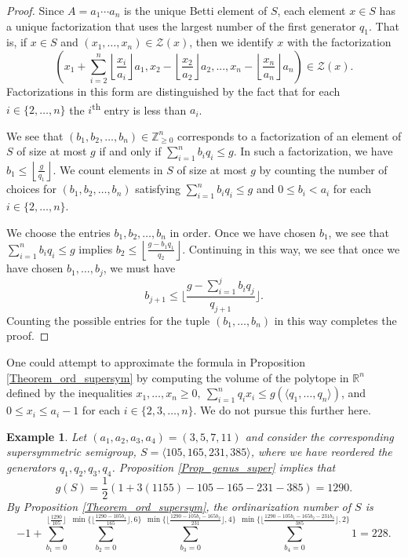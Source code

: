 \documentclass[12pt]{amsart}
\newcommand{\Z}{{\mathbb Z}}
\newcommand{\R}{{\mathbb R}}
\theoremstyle{plain}\newtheorem{proposition}{Proposition}[section]
\newtheorem{example}[proposition]{Example}
\begin{document}
\begin{proof}
Since $A = a_1 \cdots a_n$ is the unique Betti element of $S$, each element $x\in S$ has a unique factorization that uses the largest number of the first generator $q_1$.  That is, if $x \in S$ and $(x_1,\ldots, x_n) \in \mathcal{Z}(x)$, then we identify $x$ with the factorization 
\[
\left(x_1+\sum\limits_{i=2}^n \left\lfloor\frac{x_i}{a_i}\right\rfloor a_1,x_2-\left\lfloor\frac{x_2}{a_2}\right\rfloor a_2,...,x_n-\left\lfloor\frac{x_n}{a_n}\right\rfloor a_n\right) \in \mathcal{Z}(x).
\]
Factorizations in this form are distinguished by the fact that for each $i \in \{2,\ldots, n\}$ the $i$\textsuperscript{th} entry is less than $a_i$.

We see that $(b_1, b_2,\ldots, b_n) \in \Z_{\ge 0}^n$ corresponds to a factorization of an element of $S$ of size at most $g$ if and only if $\sum\limits_{i=1}^{n} b_i q_i \le g$.  In such a factorization, we have $b_1 \le \left\lfloor \frac{g}{q_1}\right\rfloor$.  We count elements in $S$ of size at most $g$ by counting the number of choices for $(b_1, b_2,\ldots, b_n)$ satisfying $\sum\limits_{i=1}^{n} b_i q_i \le g$ and $0 \le b_i < a_i$ for each $i \in \{2,\ldots, n\}$.

We choose the entries $b_1, b_2,\ldots, b_n$ in order.  Once we have chosen $b_1$, we see that $\sum\limits_{i=1}^{n} b_i q_i \le g$ implies $b_2 \le  \left\lfloor \frac{g-b_1 q_1}{q_2}\right\rfloor$.  Continuing in this way, we see that once we have chosen $b_1,\ldots, b_j$, we must have 
\[
b_{j+1} \le \bigg\lfloor \frac{g- \sum\limits_{i=1}^{j} b_i q_j}{q_{j+1}}\bigg\rfloor.
\]
Counting the possible entries for the tuple $(b_1,\ldots, b_n)$ in this way completes the proof.
\end{proof}
One could attempt to approximate the formula in Proposition \ref{Theorem_ord_supersym} by computing the volume of the polytope in $\R^n$ defined by the inequalities $x_1, \ldots, x_n \ge 0,\ \sum_{i=1}^n q_i x_i \le g(\langle q_1,\ldots, q_n \rangle)$, and $0 \le x_i \le a_i - 1$ for each $i \in \{2,3,\ldots, n\}$.  We do not pursue this further here.

\begin{example}
Let $(a_1,a_2,a_3,a_4) = (3,5,7,11)$ and consider the corresponding supersymmetric semigroup, $S=\langle 105,165,231,385 \rangle$, where we have reordered the generators $q_1,q_2,q_3,q_4$.  Proposition \ref{Prop_genus_super} implies that 
\[
g(S) = \frac{1}{2}(1+3(1155)-105-165-231-385) = 1290.
\]
By Proposition \ref{Theorem_ord_supersym}, the ordinarization number of $S$ is 
\[
-1+\sum_{b_1=0}^{\big\lfloor\frac{1290}{105}\big\rfloor}\sum_{b_2=0}^{\min\big\{ \big\lfloor\frac{1290-105b_1}{165}\big\rfloor,6\big\}}
\sum_{b_3=0}^{\min\big\{ \big\lfloor\frac{1290-105b_1-165b_2}{231}\big\rfloor,4\big\}}
\sum_{b_4=0}^{\min\big\{ \big\lfloor\frac{1290-105b_1-165b_2-231b_3}{385}\big\rfloor,2\big\}}1 =228.
\]
\end{example}
\end{document}
